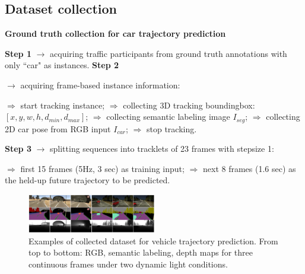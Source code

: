 \documentclass[10pt,twocolumn,letterpaper]{article}
\newlength\myindent
\newcommand\bindent[1][\myindent]{%
  \begingroup
  \setlength{\itemindent}{#1}
  \addtolength{\algorithmicindent}{#1}
}
\newcommand\eindent{\endgroup}
\begin{document}
\subsection{Dataset collection}
\begin{algorithm}[t]
\begin{algorithmic}
\caption*{\textbf{Ground truth collection for car trajectory prediction}}\label{list:dataset_collection}
\small{
\STATE \textbf{Step 1} $\rightarrow $ acquiring traffic participants from ground truth annotations with only ``car" as instances.
\STATE \textbf{Step 2} {$\rightarrow $ acquiring frame-based instance information:
{
\bindent
    \STATE $\Rightarrow$ start tracking instance;
    \STATE $\Rightarrow$ collecting 3D tracking boundingbox: $[x, y, w, h, d_{min}, d_{max}]$;
    \STATE $\Rightarrow$ collecting semantic labeling image $I_{seg}$;
    \STATE $\Rightarrow$ collecting 2D car pose from RGB input $I_{car}$;
    \STATE $\Rightarrow$ stop tracking.
    \ENDIF\eindent}
  }
\STATE \textbf{Step 3} $\rightarrow $ splitting sequences into tracklets of 23 frames with stepsize 1:
{\bindent
    \STATE $\Rightarrow$  first 15 frames (5Hz, 3 sec) as training input;
  \STATE $\Rightarrow$  next 8 frames (1.6 sec) as the held-up future trajectory to be predicted.
  \eindent}
}
\end{algorithmic}
\end{algorithm}



\begin{figure}[t]
        \centering
        \includegraphics[width=0.5\textwidth]{figures/dataset.pdf}
        \caption{
        \small{Examples of collected dataset for vehicle trajectory prediction. From top to bottom: RGB, semantic labeling, depth maps for three continuous frames under two dynamic light conditions.}
        }
        \label{fig:dataset}
\end{figure}
\end{document}
